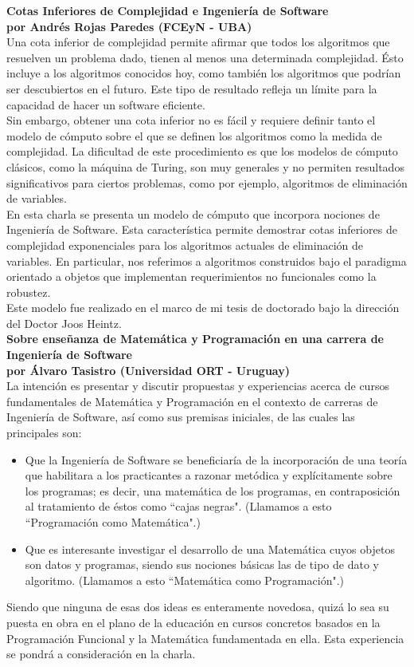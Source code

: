 \documentclass[12pt, a4paper]{article}
\newcommand{\charla}[3]{
	{\large\bf#1}\\
	{\bf por #2}\\
	#3\\
}
\begin{document}
\charla
{Cotas Inferiores de Complejidad e Ingeniería de Software}
{Andrés Rojas Paredes (FCEyN - UBA)}
{Una cota inferior de complejidad permite afirmar que todos los algoritmos que resuelven un problema dado, tienen al menos una determinada complejidad. Ésto incluye a los algoritmos conocidos hoy, como también los algoritmos que podrían ser descubiertos en el futuro. Este tipo de resultado refleja un límite para la capacidad de hacer un software eficiente. \\
Sin embargo, obtener una cota inferior no es fácil y requiere definir tanto el modelo de cómputo sobre el que se definen los algoritmos como la medida de complejidad. La dificultad de este procedimiento es que los modelos de cómputo clásicos, como la máquina de Turing, son muy generales y no permiten resultados significativos para ciertos problemas, como por ejemplo, algoritmos de eliminación de variables. \\
En esta charla se presenta un modelo de cómputo que incorpora nociones de Ingeniería de Software. Esta característica permite demostrar cotas inferiores de complejidad exponenciales para los algoritmos actuales de eliminación de variables. En particular, nos referimos a algoritmos construidos bajo el paradigma orientado a objetos que implementan requerimientos no funcionales como la robustez. \\
Este modelo fue realizado en el marco de mi tesis de doctorado bajo la dirección del Doctor Joos Heintz.}

\charla
{Sobre enseñanza de Matemática y Programación en una carrera de Ingeniería de Software}
{Álvaro Tasistro (Universidad ORT - Uruguay)}
{La intención es presentar y discutir propuestas y experiencias acerca de cursos fundamentales de Matemática y Programación en el contexto de carreras de Ingeniería de Software, así como sus premisas iniciales, de las cuales las principales son:
\begin{itemize}
\item Que la Ingeniería de Software se beneficiaría de la incorporación de una teoría que habilitara a los practicantes a razonar metódica y explícitamente sobre los programas; es decir, una matemática de los programas, en contraposición al tratamiento de éstos como ``cajas negras". (Llamamos a esto ``Programación como Matemática".)
\item Que es interesante investigar el desarrollo de una Matemática cuyos objetos son datos y programas, siendo sus nociones básicas las de tipo de dato y algoritmo. (Llamamos a esto ``Matemática como Programación".)
\end{itemize}
Siendo que ninguna de esas dos ideas es enteramente novedosa, quizá lo sea su puesta en obra en el plano de la educación en cursos concretos basados en la Programación Funcional y la Matemática fundamentada en ella. Esta experiencia se pondrá a consideración en la charla.}
\end{document}
